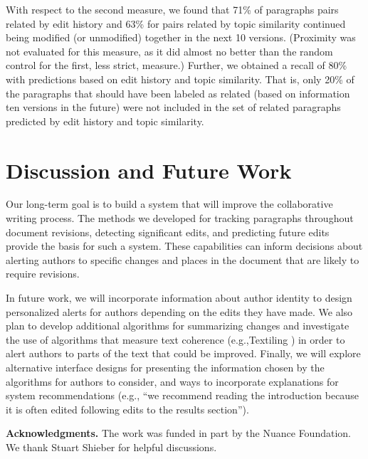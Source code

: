 With respect to the second measure, we found that 71\% of paragraphs
pairs related by edit history and 63\% for pairs related by topic
similarity continued being modified (or unmodified) together in the next
10 versions. (Proximity was not evaluated for this measure, as it did
almost no better than the random control for the first, less strict,
measure.) Further, we obtained a recall of 80\% with predictions based
on edit history and topic similarity. That is, only 20\% of the
paragraphs that should have been labeled as related (based on
information ten versions in the future) were not included in the set of
related paragraphs predicted by edit history and topic similarity.

\section{Discussion and Future Work}\label{discussion-and-future-work}

Our long-term goal is to build a system that will improve the
collaborative writing process. The methods we developed for tracking
paragraphs throughout document revisions, detecting significant edits,
and predicting future edits provide the basis for such a system. These
capabilities can inform decisions about alerting authors to specific
changes and places in the document that are likely to require revisions.

In future work, we will incorporate information about author identity to
design personalized alerts for authors depending on the edits they have
made. We also plan to develop additional algorithms for summarizing
changes and investigate the use of algorithms that measure text
coherence (e.g.,Textiling \cite{hearst1994multi}) in order to alert
authors to parts of the text that could be improved. Finally, we will
explore alternative interface designs for presenting the information
chosen by the algorithms for authors to consider, and ways to
incorporate explanations for system recommendations (e.g., ``we
recommend reading the introduction because it is often edited following
edits to the results section'').

\textbf{Acknowledgments.} The work was funded in part by the Nuance
Foundation. We thank Stuart Shieber for helpful discussions.

